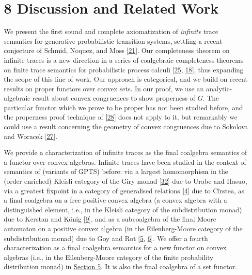 \documentclass[11pt,a4paper]{amsart}
\begin{document}
\hypertarget{html:S8}{} \section*{8 Discussion and Related Work}
\hypertarget{html:S8.p1}{} We present the first sound and complete axiomatization of \emph{infinite} trace semantics for generative probabilistic transition systems, settling a recent conjecture of Schmid, Noquez, and Moss [\hyperlink{html:bib.bib21}{21}]. Our completeness theorem on infinite traces is a new direction in a series of coalgebraic completeness theorems on finite trace semantics for probabilistic process calculi [\hyperlink{html:bib.bib25}{25}, \hyperlink{html:bib.bib18}{18}], thus expanding the scope of this line of work. Our approach is categorical, and we build on recent results on proper functors over convex sets. In our proof, we use an analytic-algebraic result about convex congruences to show properness of %
\hypertarget{html:S8.p1.m1}{}\({G}\). The particular functor which we prove to be proper has not been studied before, and the properness proof technique of [\hyperlink{html:bib.bib28}{28}] does not apply to it, but remarkably we could use a result concerning the geometry of convex congruences due to Sokolova and Woracek [\hyperlink{html:bib.bib27}{27}].
\par\medskip
\hypertarget{html:S8.p2}{} We provide a characterization of infinite traces as the final coalgebra semantics of a functor over convex algebras. Infinite traces have been studied in the context of semantics of (variants of GPTS) before: via a largest homomorphism in the (order enriched) Kleisli category of the Giry monad [\hyperlink{html:bib.bib32}{32}] due to Urabe and Hasuo, via a greatest fixpoint in a category of generalised relations [\hyperlink{html:bib.bib4}{4}] due to Cîrstea, as a final coalgebra on a free positive convex algebra (a convex algebra with a distinguished element, i.e., in the Kleisli category of the subdistribution monad) due to Kerstan and König [\hyperlink{html:bib.bib9}{9}], and as a subcoalgebra of the final Moore automaton on a positive convex algebra (in the Eilenberg-Moore category of the subdistribution monad) due to Goy and Rot [\hyperlink{html:bib.bib5}{5}, \hyperlink{html:bib.bib6}{6}]. We offer a fourth characterization as a final coalgebra semantics for a new functor on convex algebras (i.e., in the Eilenberg-Moore category of the finite probability distribution monad) in \hyperlink{html:S5}{Section 5}. It is also the final coalgebra of a set functor.
\end{document}
